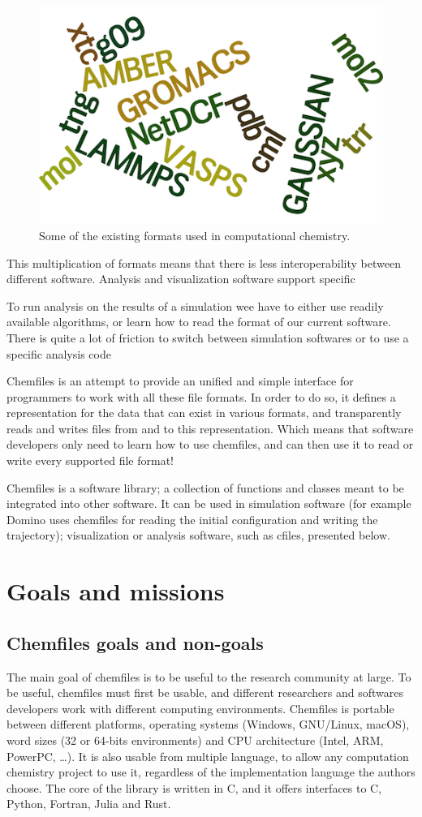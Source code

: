 \documentclass[thesis]{subfiles}
\def\cxx{{C\nolinebreak[4]\hspace{-.05em}\raisebox{.3ex}{\footnotesize ++}}\xspace}
\begin{document}
\begin{figure}[ht]
    \centering
    \includegraphics[width=.4\textwidth]{figures/images/files-formats}
    \caption{Some of the existing formats used in computational chemistry.}
    \label{fig:chemfiles:formats}
\end{figure}

This multiplication of formats means that there is less interoperability between
different software. Analysis and visualization software support specific

To run analysis on the results of a simulation wee have to
either use readily available algorithms, or learn how to read the format of our
current software. There is quite a lot of friction to switch between simulation
softwares or to use a specific analysis code

Chemfiles is an attempt to provide an unified and simple interface for
programmers to work with all these file formats. In order to do so, it defines a
representation for the data that can exist in various formats, and transparently
reads and writes files from and to this representation. Which means that
software developers only need to learn how to use chemfiles, and can then use it
to read or write every supported file format!

Chemfiles is a software library; a collection of functions and classes meant to
be integrated into other software. It can be used in simulation software (for
example Domino uses chemfiles for reading the initial configuration and writing
the trajectory); visualization or analysis software, such as cfiles, presented
below.

\section{Goals and missions}

\subsection{Chemfiles goals and non-goals}

The main goal of chemfiles is to be useful to the research community at large.
To be useful, chemfiles must first be usable, and different researchers and
softwares developers work with different computing environments. Chemfiles is
portable between different platforms, operating systems (Windows, GNU/Linux,
macOS), word sizes (32 or 64-bits environments) and CPU architecture (Intel,
ARM, PowerPC, \dots). It is also usable from multiple language, to allow any
computation chemistry project to use it, regardless of the implementation
language the authors choose. The core of the library is written in \cxx, and it
offers interfaces to C, Python, Fortran, Julia and Rust.
\end{document}
